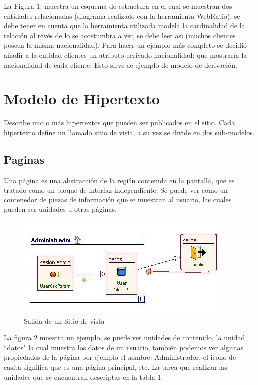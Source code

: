 La Figura 1. muestra un esquema de estructura en el cual se muestran dos 
entidades relacionadas (diagrama realizado con la herramienta WebRatio), se
debe tener en cuenta que la herramienta utilizada modela la cardinalidad de la
relaci\'on al rev\'es de lo se acostumbra a ver, se debe leer as\'{\i} (muchos clientes
poseen la misma nacionalidad). Para hacer un ejemplo m\'as completo se decidi\'o
a\~nadir a la entidad clientes un atributo derivado nacionalidad: que mostrar\'{\i}a 
la nacionalidad de cada cliente. Esto sirve de ejemplo de modelo de derivaci\'on.


\section{Modelo de Hipertexto}

Describe uno o m\'as hipertextos que pueden ser publicados en el sitio. Cada 
hipertexto define un llamado sitio de vista, a su vez se divide en dos 
sub-modelos.


\subsection{Paginas}

Una p\'agina es una abstracci\'on de la regi\'on contenida en la pantalla, que es 
tratado como un bloque de interfaz independiente. Se puede ver como un 
contenedor de piezas de informaci\'on que se muestran al usuario, las cuales
pueden ser unidades u otras p\'aginas.

\begin{figure}[H]
    \centering
    \includegraphics[scale=1]{resourse/salida-sitio-vista.jpg}
    \caption{Salida de un Sitio de vista}
    \label{fig:02}
\end{figure}  

La figura 2 muestra un ejemplo, se puede ver  unidades de contenido, la unidad
``datos" la cual muestra los datos de un usuario, tambi\'en podemos  ver algunas 
propiedades de la p\'agina por ejemplo el nombre: Administrador, el icono de
casita significa que es una p\'agina principal, etc. La tarea que realizan las
unidades que se encuentran descriptas en la tabla 1.

